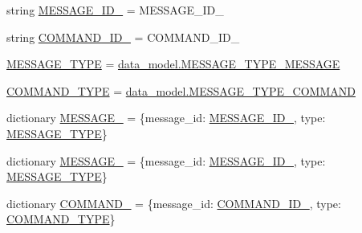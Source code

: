 \begin{DoxyCompactItemize}
\item 
string \hyperlink{namespaceparlai_1_1mturk_1_1core_1_1test_1_1test__mturk__agent_a0f7cc141a8375110f095e6a1296cf0df}{M\+E\+S\+S\+A\+G\+E\+\_\+\+I\+D\+\_} = \textquotesingle{}M\+E\+S\+S\+A\+G\+E\+\_\+\+I\+D\+\_\textquotesingle{}
\item 
string \hyperlink{namespaceparlai_1_1mturk_1_1core_1_1test_1_1test__mturk__agent_a903c50ddc706fc0e3007be831ba9449f}{C\+O\+M\+M\+A\+N\+D\+\_\+\+I\+D\+\_} = \textquotesingle{}C\+O\+M\+M\+A\+N\+D\+\_\+\+I\+D\+\_\textquotesingle{}
\item 
\hyperlink{namespaceparlai_1_1mturk_1_1core_1_1test_1_1test__mturk__agent_a8fb6bdc14a48e21893157192cf270fa2}{M\+E\+S\+S\+A\+G\+E\+\_\+\+T\+Y\+PE} = \hyperlink{namespaceparlai_1_1mturk_1_1core_1_1data__model_a61c70a0a282586fc0e09b40ada1f28bf}{data\+\_\+model.\+M\+E\+S\+S\+A\+G\+E\+\_\+\+T\+Y\+P\+E\+\_\+\+M\+E\+S\+S\+A\+GE}
\item 
\hyperlink{namespaceparlai_1_1mturk_1_1core_1_1test_1_1test__mturk__agent_a9ad87a0ebfde514be4dfa41eea065215}{C\+O\+M\+M\+A\+N\+D\+\_\+\+T\+Y\+PE} = \hyperlink{namespaceparlai_1_1mturk_1_1core_1_1data__model_a6750ce7f276954a237bd83a74170c57f}{data\+\_\+model.\+M\+E\+S\+S\+A\+G\+E\+\_\+\+T\+Y\+P\+E\+\_\+\+C\+O\+M\+M\+A\+ND}
\item 
dictionary \hyperlink{namespaceparlai_1_1mturk_1_1core_1_1test_1_1test__mturk__agent_ae1d7939673c68acd59c10b2b44c2dc8a}{M\+E\+S\+S\+A\+G\+E\+\_} = \{\textquotesingle{}message\+\_\+id\textquotesingle{}\+: \hyperlink{namespaceparlai_1_1mturk_1_1core_1_1test_1_1test__mturk__agent_a250b06be24c2400681ccdf083403890a}{M\+E\+S\+S\+A\+G\+E\+\_\+\+I\+D\+\_}, \textquotesingle{}type\textquotesingle{}\+: \hyperlink{namespaceparlai_1_1mturk_1_1core_1_1test_1_1test__mturk__agent_a8fb6bdc14a48e21893157192cf270fa2}{M\+E\+S\+S\+A\+G\+E\+\_\+\+T\+Y\+PE}\}
\item 
dictionary \hyperlink{namespaceparlai_1_1mturk_1_1core_1_1test_1_1test__mturk__agent_ae6fcdf28088dea1e0d8e3520b86c732b}{M\+E\+S\+S\+A\+G\+E\+\_} = \{\textquotesingle{}message\+\_\+id\textquotesingle{}\+: \hyperlink{namespaceparlai_1_1mturk_1_1core_1_1test_1_1test__mturk__agent_a0f7cc141a8375110f095e6a1296cf0df}{M\+E\+S\+S\+A\+G\+E\+\_\+\+I\+D\+\_}, \textquotesingle{}type\textquotesingle{}\+: \hyperlink{namespaceparlai_1_1mturk_1_1core_1_1test_1_1test__mturk__agent_a8fb6bdc14a48e21893157192cf270fa2}{M\+E\+S\+S\+A\+G\+E\+\_\+\+T\+Y\+PE}\}
\item 
dictionary \hyperlink{namespaceparlai_1_1mturk_1_1core_1_1test_1_1test__mturk__agent_ab74da20095fbca228ed547d13821f619}{C\+O\+M\+M\+A\+N\+D\+\_} = \{\textquotesingle{}message\+\_\+id\textquotesingle{}\+: \hyperlink{namespaceparlai_1_1mturk_1_1core_1_1test_1_1test__mturk__agent_a903c50ddc706fc0e3007be831ba9449f}{C\+O\+M\+M\+A\+N\+D\+\_\+\+I\+D\+\_}, \textquotesingle{}type\textquotesingle{}\+: \hyperlink{namespaceparlai_1_1mturk_1_1core_1_1test_1_1test__mturk__agent_a9ad87a0ebfde514be4dfa41eea065215}{C\+O\+M\+M\+A\+N\+D\+\_\+\+T\+Y\+PE}\}

\end{DoxyCompactItemize}
